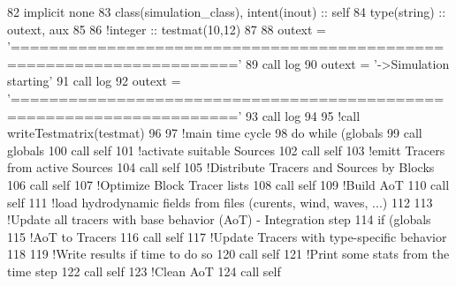 \begin{DoxyCode}
82     \textcolor{keywordtype}{implicit none}
83     \textcolor{keywordtype}{class}(simulation\_class), \textcolor{keywordtype}{intent(inout)} :: self
84     \textcolor{keywordtype}{type}(string) :: outext, aux
85 
86     \textcolor{comment}{!integer :: testmat(10,12)}
87 
88     outext = \textcolor{stringliteral}{'====================================================================='}
89     \textcolor{keyword}{call }log%
90     outext = \textcolor{stringliteral}{'->Simulation starting'}
91     \textcolor{keyword}{call }log%
92     outext = \textcolor{stringliteral}{'====================================================================='}
93     \textcolor{keyword}{call }log%
94 
95     \textcolor{comment}{!call writeTestmatrix(testmat)}
96 
97     \textcolor{comment}{!main time cycle}
98     \textcolor{keywordflow}{do} \textcolor{keywordflow}{while} (globals%
99         \textcolor{keyword}{call }globals%
100         \textcolor{keyword}{call }self%
101         \textcolor{comment}{!activate suitable Sources}
102         \textcolor{keyword}{call }self%
103         \textcolor{comment}{!emitt Tracers from active Sources}
104         \textcolor{keyword}{call }self%
105         \textcolor{comment}{!Distribute Tracers and Sources by Blocks}
106         \textcolor{keyword}{call }self%
107         \textcolor{comment}{!Optimize Block Tracer lists}
108         \textcolor{keyword}{call }self%
109         \textcolor{comment}{!Build AoT}
110         \textcolor{keyword}{call }self%
111         \textcolor{comment}{!load hydrodynamic fields from files (curents, wind, waves, ...)}
112 
113         \textcolor{comment}{!Update all tracers with base behavior (AoT) - Integration step}
114         \textcolor{keywordflow}{if} (globals%
115         \textcolor{comment}{!AoT to Tracers}
116         \textcolor{keyword}{call }self%
117         \textcolor{comment}{!Update Tracers with type-specific behavior}
118 
119         \textcolor{comment}{!Write results if time to do so}
120         \textcolor{keyword}{call }self%
121         \textcolor{comment}{!Print some stats from the time step}
122         \textcolor{keyword}{call }self%
123         \textcolor{comment}{!Clean AoT}
124         \textcolor{keyword}{call }self%

\end{DoxyCode}
